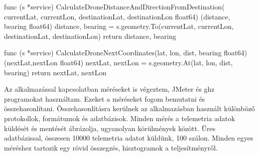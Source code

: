 \begin{python}
    func (s *service) CalculateDroneDistanceAndDirectionFromDestination(
    currentLat, currentLon, destinationLat, destinationLon float64)
    (distance, bearing float64) {
        distance, bearing = s.geometry.To(currentLat,
        currentLon, destinationLat, destinationLon)
        return distance, bearing
    }

    func (s *service) CalculateDroneNextCoordinates(lat, lon,
    dist, bearing float64) (nextLat,nextLon float64) {
        nextLat, nextLon = s.geometry.At(lat, lon, dist, bearing)
        return nextLat, nextLon
    }
\end{python}


Az alkalmazással kapcsolatban méréseket is végeztem, JMeter\cite{apache}  és ghz\cite{ghz} programokat használtam.
Ezeket a méréseket fogom bemutatni és összehasonlítani.
Összehasonlításra kerülnek az alkalmazásban használt különböző protokollok, formátumok és adatbázisok.
Minden mérés a telemetria adatok küldését és mentését ábrázolja, ugyanolyan körülmények között.
Üres adatbázissal, összesen 10000 telemetria adatot küldünk, 100 szálon.
Minden egyes méréshez tartozik egy rövid összegzés, hisztogramok a teljesítményről.

